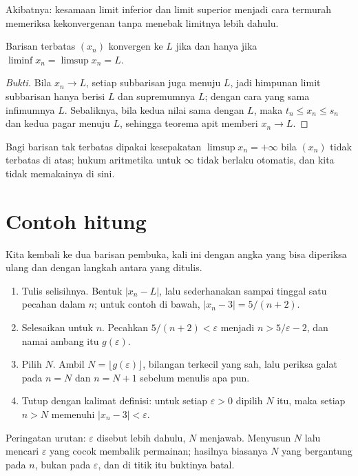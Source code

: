 Akibatnya: kesamaan limit inferior dan limit superior menjadi cara termurah
memeriksa kekonvergenan tanpa menebak limitnya lebih dahulu.

\begin{akibat}
Barisan terbatas $(x_n)$ konvergen ke $L$ jika dan hanya jika
$\liminf x_n = \limsup x_n = L$.
\end{akibat}

\begin{proof}[Bukti]
Bila $x_n \to L$, setiap subbarisan juga menuju $L$, jadi himpunan limit
subbarisan hanya berisi $L$ dan supremumnya $L$; dengan cara yang sama infimumnya
$L$. Sebaliknya, bila kedua nilai sama dengan $L$, maka $t_n \le x_n \le s_n$ dan
kedua pagar menuju $L$, sehingga teorema apit memberi $x_n \to L$.
\end{proof}

Bagi barisan tak terbatas dipakai kesepakatan $\limsup x_n=+\infty$ bila $(x_n)$
tidak terbatas di atas; hukum aritmetika untuk $\infty$ tidak berlaku otomatis, dan
kita tidak memakainya di sini.

\section{Contoh hitung}

Kita kembali ke dua barisan pembuka, kali ini dengan angka yang bisa diperiksa
ulang dan dengan langkah antara yang ditulis.

\begin{resep}
\begin{enumerate}
  \item Tulis selisihnya. Bentuk $|x_n-L|$, lalu sederhanakan sampai tinggal satu
        pecahan dalam $n$; untuk contoh di bawah, $|x_n-3|=5/(n+2)$.
  \item Selesaikan untuk $n$. Pecahkan $5/(n+2)<\varepsilon$ menjadi
        $n>5/\varepsilon-2$, dan namai ambang itu $g(\varepsilon)$.
  \item Pilih $N$. Ambil $N=\lfloor g(\varepsilon)\rfloor$, bilangan terkecil yang
        sah, lalu periksa galat pada $n=N$ dan $n=N+1$ sebelum menulis apa pun.
  \item Tutup dengan kalimat definisi: untuk setiap $\varepsilon>0$ dipilih $N$
        itu, maka setiap $n>N$ memenuhi $|x_n-3|<\varepsilon$.
\end{enumerate}
Peringatan urutan: $\varepsilon$ disebut lebih dahulu, $N$ menjawab. Menyusun $N$
lalu mencari $\varepsilon$ yang cocok membalik permainan; hasilnya biasanya $N$
yang bergantung pada $n$, bukan pada $\varepsilon$, dan di titik itu buktinya batal.
\end{resep}

